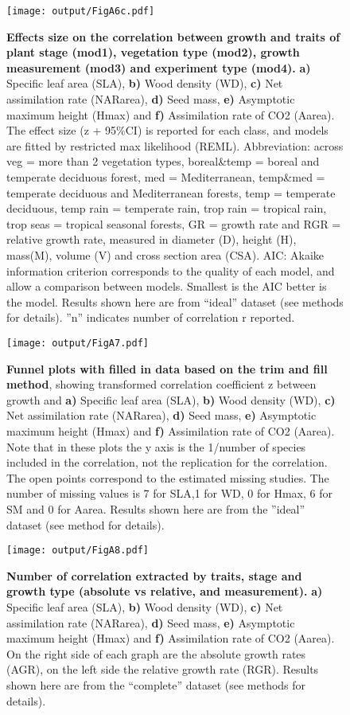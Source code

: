 \documentclass[a4paper,11pt]{article}
\begin{document}
\begin{appendices}
\begin{figure}[h!]
\centering
\texttt{[image: output/FigA6c.pdf]}
\caption{\textbf{Effects size on the correlation between growth and traits of plant stage (mod1), vegetation type (mod2), growth measurement (mod3) and experiment type (mod4).} \textbf{a)} Specific leaf area (SLA), \textbf{b)} Wood density (WD), \textbf{c)} Net assimilation rate (NARarea), \textbf{d)} Seed mass, \textbf{e)} Asymptotic maximum height (Hmax) and \textbf{f)} Assimilation rate of CO2 (Aarea). The effect size (z + 95\%CI) is reported for each class, and models are fitted by restricted max likelihood (REML). Abbreviation: across veg = more than 2 vegetation types, boreal\&temp = boreal and temperate deciduous forest, med = Mediterranean,  temp\&med = temperate deciduous and Mediterranean forests, temp = temperate deciduous, temp rain = temperate rain, trop rain = tropical rain, trop seas = tropical seasonal forests, GR = growth rate and RGR = relative growth rate, measured in diameter (D), height (H), mass(M), volume (V) and cross section area (CSA). AIC: Akaike information criterion corresponds to the quality of each model, and allow a comparison between models. Smallest is the AIC better is the model. Results shown here are from ``ideal'' dataset (see methods for details). ''n'' indicates number of correlation r reported.}
\label{fig:figA6}
\end{figure}

\begin{figure}[h!]
\centering
\texttt{[image: output/FigA7.pdf]}
\caption{\textbf{Funnel plots with filled in data based on the trim and fill method}, showing transformed correlation coefficient z between growth and \textbf{a)} Specific leaf area (SLA), \textbf{b)} Wood density (WD), \textbf{c)} Net assimilation rate (NARarea), \textbf{d)} Seed mass, \textbf{e)} Asymptotic maximum height (Hmax) and \textbf{f)} Assimilation rate of CO2 (Aarea). Note that in these plots the y axis is the 1/number of species included in the correlation, not the replication for the correlation. The open points correspond to the estimated missing studies. The number of missing values is 7 for SLA,1 for WD, 0 for Hmax, 6 for SM and 0 for Aarea. Results shown here are from the ''ideal'' dataset (see method for details).}
\label{fig:figA7}
\end{figure}

\begin{figure}[h!]
\centering
\texttt{[image: output/FigA8.pdf]}
\caption{\textbf{Number of correlation extracted by traits, stage and growth type (absolute vs relative, and measurement).} \textbf{a)} Specific leaf area (SLA), \textbf{b)} Wood density (WD), \textbf{c)} Net assimilation rate (NARarea), \textbf{d)} Seed mass, \textbf{e)} Asymptotic maximum height (Hmax) and \textbf{f)} Assimilation rate of CO2 (Aarea). On the right side of each graph are the absolute growth rates (AGR), on the left side the relative growth rate (RGR). Results shown here are from the ``complete'' dataset (see methods for details). }
\label{fig:figA8}
\end{figure}


\end{appendices}
\end{document}
